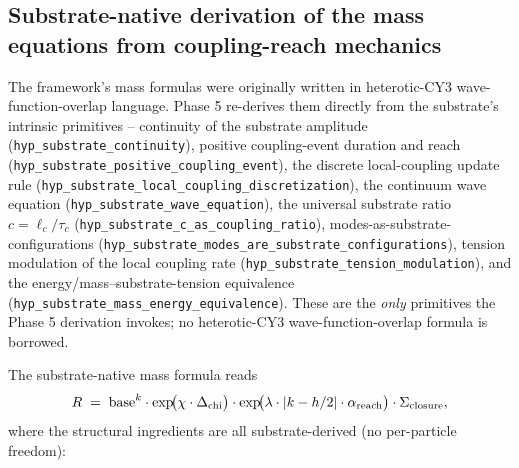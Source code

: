 ﻿\documentclass[reprint,amsmath,amssymb,aps,prd,longbibliography,floatfix]{revtex4-2}
\begin{document}
\subsection{Substrate-native derivation of the mass equations from
coupling-reach mechanics}
\label{sec:phase5-substrate-native}

The framework's mass formulas were originally written in
heterotic-CY3 wave-function-overlap language. Phase 5 re-derives them
directly from the substrate's intrinsic primitives -- continuity of
the substrate amplitude
(\texttt{hyp\_substrate\_continuity}), positive coupling-event
duration and reach
(\texttt{hyp\_substrate\_positive\_coupling\_event}), the
discrete local-coupling update rule
(\texttt{hyp\_substrate\_local\_coupling\_discretization}), the
continuum wave equation
(\texttt{hyp\_substrate\_wave\_equation}), the universal
substrate ratio $c = \ell_c/\tau_c$
(\texttt{hyp\_substrate\_c\_as\_coupling\_ratio}), modes-as-substrate-configurations
(\texttt{hyp\_substrate\_modes\_are\_substrate\_configurations}),
tension modulation of the local coupling rate
(\texttt{hyp\_substrate\_tension\_modulation}), and the
energy/mass--substrate-tension equivalence
(\texttt{hyp\_substrate\_mass\_energy\_equivalence}). These are the
\emph{only} primitives the Phase 5 derivation invokes; no
heterotic-CY3 wave-function-overlap formula is borrowed.

The substrate-native mass formula reads
\begin{equation}
  R \;=\; \mathrm{base}^{k} \cdot
          \exp\!\bigl( \chi \cdot \Delta_{\rm chi} \bigr) \cdot
          \exp\!\bigl( \lambda \cdot |k - h/2| \cdot \alpha_{\rm reach} \bigr) \cdot
          \Sigma_{\rm closure},
\label{eq:substrate-native-mass}
\end{equation}
where the structural ingredients are all substrate-derived (no
per-particle freedom):
\end{document}
